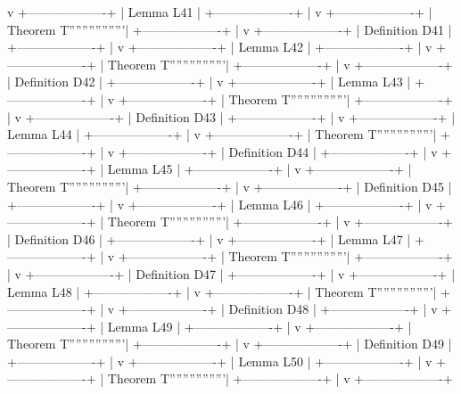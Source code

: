         v
+-------------------+
| Lemma L41         |
+-------------------+
        |
        v
+-------------------+
| Theorem T'''''''''''''''''|
+-------------------+
        |
        v
+-------------------+
| Definition D41    |
+-------------------+
        |
        v
+-------------------+
| Lemma L42         |
+-------------------+
        |
        v
+-------------------+
| Theorem T'''''''''''''''''|
+-------------------+
        |
        v
+-------------------+
| Definition D42    |
+-------------------+
        |
        v
+-------------------+
| Lemma L43         |
+-------------------+
        |
        v
+-------------------+
| Theorem T'''''''''''''''''|
+-------------------+
        |
        v
+-------------------+
| Definition D43    |
+-------------------+
        |
        v
+-------------------+
| Lemma L44         |
+-------------------+
        |
        v
+-------------------+
| Theorem T'''''''''''''''''|
+-------------------+
        |
        v
+-------------------+
| Definition D44    |
+-------------------+
        |
        v
+-------------------+
| Lemma L45         |
+-------------------+
        |
        v
+-------------------+
| Theorem T'''''''''''''''''|
+-------------------+
        |
        v
+-------------------+
| Definition D45    |
+-------------------+
        |
        v
+-------------------+
| Lemma L46         |
+-------------------+
        |
        v
+-------------------+
| Theorem T'''''''''''''''''|
+-------------------+
        |
        v
+-------------------+
| Definition D46    |
+-------------------+
        |
        v
+-------------------+
| Lemma L47         |
+-------------------+
        |
        v
+-------------------+
| Theorem T'''''''''''''''''|
+-------------------+
        |
        v
+-------------------+
| Definition D47    |
+-------------------+
        |
        v
+-------------------+
| Lemma L48         |
+-------------------+
        |
        v
+-------------------+
| Theorem T'''''''''''''''''|
+-------------------+
        |
        v
+-------------------+
| Definition D48    |
+-------------------+
        |
        v
+-------------------+
| Lemma L49         |
+-------------------+
        |
        v
+-------------------+
| Theorem T'''''''''''''''''|
+-------------------+
        |
        v
+-------------------+
| Definition D49    |
+-------------------+
        |
        v
+-------------------+
| Lemma L50         |
+-------------------+
        |
        v
+-------------------+
| Theorem T'''''''''''''''''|
+-------------------+
        |
        v
+-------------------+
